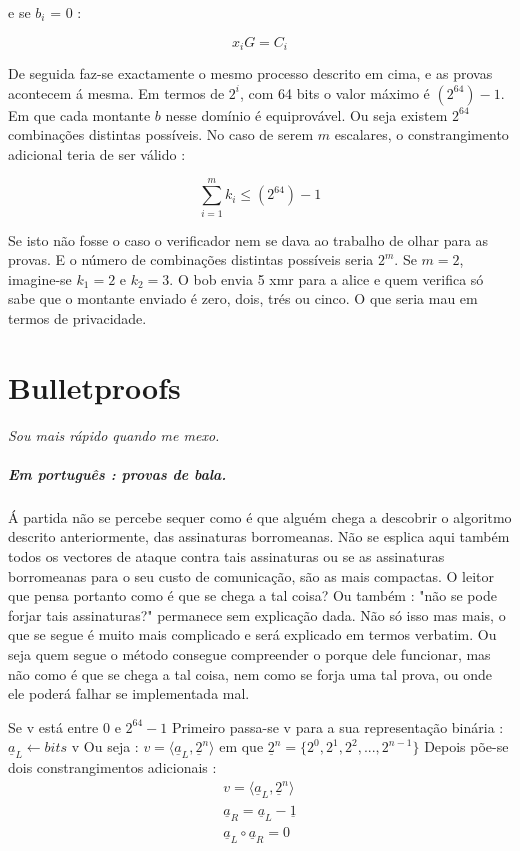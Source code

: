 e se $b_i$ = 0 :

\vspace{.175cm}
\[x_i G = C_{i} \]
\vspace{.175cm}


De seguida faz-se exactamente o mesmo processo descrito em cima, e as provas acontecem á mesma. Em termos de $2^i$, com 64 bits o valor máximo é $(2^{64})-1$. Em que cada montante $b$ nesse domínio é equiprovável. Ou seja existem $2^{64}$ combinações distintas possíveis. No caso de serem $m$ escalares, o constrangimento adicional teria de ser válido : 

\[\sum_{i=1}^{m} k_i \leq (2^{64})-1 \]

Se isto não fosse o caso o verificador nem se dava ao trabalho de olhar para as provas. E o número de combinações distintas possíveis seria $2^m$. Se $m=2$, imagine-se $k_1=2$ e $k_2=3$. O bob envia 5 xmr para a alice e quem verifica só sabe que o montante enviado é zero, dois, trés ou cinco. O que seria mau em termos de privacidade. 

\section{Bulletproofs}
\label{sec:bullet_proofs}

\centerline{{\it Sou mais rápido quando me mexo.}}
\centerline{\quad \quad \quad \quad \quad \quad \quad \quad \quad \quad \quad \quad \quad \quad {}}

\subparagraph{Em português : provas de bala.\newline}

Á partida não se percebe sequer como é que alguém chega a descobrir o algoritmo descrito anteriormente, das assinaturas borromeanas. Não se esplica aqui também todos os vectores de ataque contra tais assinaturas ou se as assinaturas borromeanas para o seu custo de comunicação, são as mais compactas. O leitor que pensa portanto como é que se chega a tal coisa? Ou também : "não se pode forjar tais assinaturas?" permanece sem explicação dada. Não só isso mas mais, o que se segue é muito mais complicado e será explicado em termos verbatim. Ou seja quem segue o método consegue compreender o porque dele funcionar, mas não como é que se chega a tal coisa, nem como se forja uma tal prova, ou onde ele poderá falhar se implementada mal.

Se v está entre 0 e $2^{64} - 1$  \newline
Primeiro passa-se v para a sua representação binária :\newline $\underline{a}_L \leftarrow bits$ v \newline
Ou seja : \newline $v = \langle\underline{a}_L, \underline{2}^n\rangle$ \newline
em que $\underline{2}^n = \{2^0, 2^1, 2^2, ..., 2^{n-1}\}$
Depois põe-se dois constrangimentos adicionais :
\begin{align*}
v = \langle\underline{a}_L, \underline{2}^n\rangle\\
\underline{a}_R = \underline{a}_L - \underline{1}\\
\underline{a}_L \circ \underline{a}_R  = 0
\end{align*}

